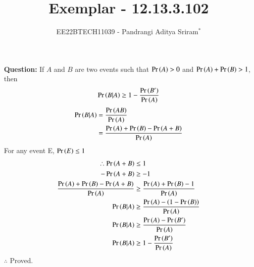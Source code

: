 \documentclass[journal,12pt,twocolumn]{IEEEtran}
\theoremstyle{remark}
\begin{document}

\vspace{3cm}

\title{Exemplar - 12.13.3.102}
\author{EE22BTECH11039 - Pandrangi Aditya Sriram$^{*}$%
}
\maketitle
\newpage
\bigskip

\renewcommand{\thefigure}{\theenumi}
\renewcommand{\thetable}{\theenumi}


\vspace{3cm}
\textbf{Question:} If $A$ and $B$ are two events such that $\Pr\left(A\right) > 0$ and $\Pr\left(A\right) + \Pr\left(B\right) > 1$, then 
\begin{align*}
    \Pr\left(B | A\right) \geq 1 - \frac{\Pr\left(B^\prime\right)}{\Pr\left(A\right)}
\end{align*}
\solution
\fi
\begin{align}
    \Pr\left(B|A\right) &= \frac{\Pr\left(AB\right)}{\Pr\left(A\right)}\\
    &= \frac{\Pr\left(A\right) + \Pr\left(B\right) - \Pr\left(A+B\right)}{\Pr\left(A\right)}
\end{align}
For any event E, $\Pr\left(E\right) \leq 1$
\begin{align}
    \therefore \Pr\left(A + B\right) &\leq 1\\
    -\Pr\left(A + B\right) &\geq -1\\
    \frac{\Pr\left(A\right) + \Pr\left(B\right) - \Pr\left(A + B\right)}{\Pr\left(A\right)} &\geq \frac{\Pr\left(A\right) + \Pr\left(B\right) - 1}{\Pr\left(A\right)}\\
    \Pr\left(B|A\right) &\geq \frac{\Pr\left(A\right) - \left(1 -\Pr\left(B\right)\right)}{\Pr\left(A\right)}\\
    \Pr\left(B|A\right) &\geq \frac{\Pr\left(A\right) - \Pr\left(B^\prime\right)}{\Pr\left(A\right)}\\
    \Pr\left(B|A\right) &\geq 1 - \frac{\Pr\left(B^\prime\right)}{\Pr\left(A\right)}
\end{align}
$\therefore$ Proved.
\end{document}
